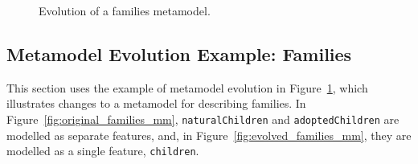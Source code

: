\begin{figure}[htbp]
	\centering
	\caption{Evolution of a families metamodel.}
\label{fig:families_mms}
\end{figure}

\subsection{Metamodel Evolution Example: Families}
\label{subsec:families_example}
This section uses the example of metamodel evolution in Figure~\ref{fig:families_mms}, which illustrates changes to a metamodel for describing families. In Figure~\ref{fig:original_families_mm}, \texttt{na\-tu\-r\-alCh\-il\-dr\-en} and \texttt{ad\-op\-t\-edCh\-il\-dr\-en} are modelled as separate features, and, in Figure~\ref{fig:evolved_families_mm}, they are modelled as a single feature, \texttt{ch\-il\-dr\-en}.

